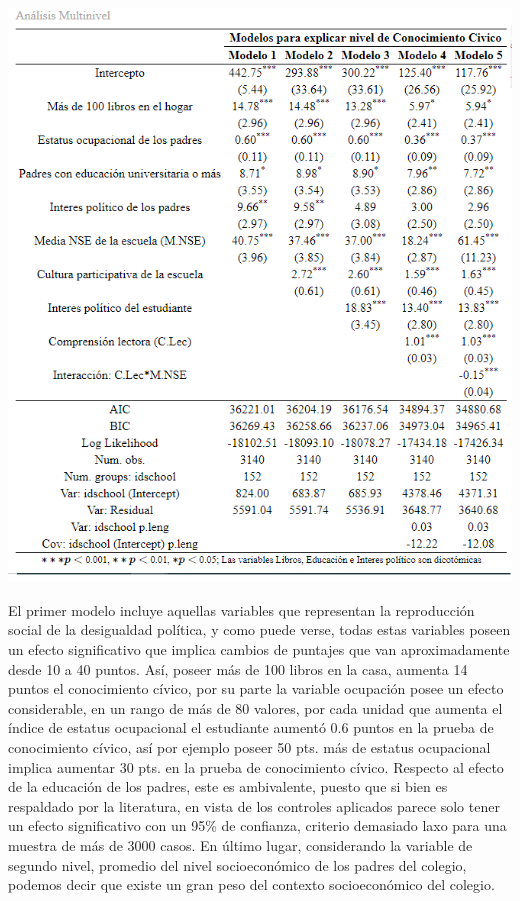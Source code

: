 \documentclass[12pt,twoside]{templates/facsothesis}
\begin{document}
\begin{center}\includegraphics[width=1.2\linewidth]{images/regmultinivel} \end{center}

El primer modelo incluye aquellas variables que representan la reproducción social de la desigualdad política, y como puede verse, todas estas variables poseen un efecto significativo que implica cambios de puntajes que van aproximadamente desde 10 a 40 puntos. Así, poseer más de 100 libros en la casa, aumenta 14 puntos el conocimiento cívico, por su parte la variable ocupación posee un efecto considerable, en un rango de más de 80 valores, por cada unidad que aumenta el índice de estatus ocupacional el estudiante aumentó 0.6 puntos en la prueba de conocimiento cívico, así por ejemplo poseer 50 pts. más de estatus ocupacional implica aumentar 30 pts. en la prueba de conocimiento cívico. Respecto al efecto de la educación de los padres, este es ambivalente, puesto que si bien es respaldado por la literatura, en vista de los controles aplicados parece solo tener un efecto significativo con un 95\% de confianza, criterio demasiado laxo para una muestra de más de 3000 casos. En último lugar, considerando la variable de segundo nivel, promedio del nivel socioeconómico de los padres del colegio, podemos decir que existe un gran peso del contexto socioeconómico del colegio.
\end{document}
